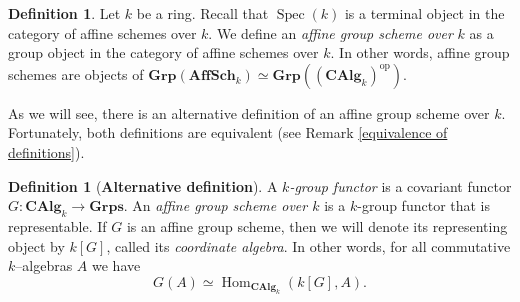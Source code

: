 \documentclass{article}
\theoremstyle{plain}
\theoremstyle{definition}
\newtheorem{Def}[Th]{Definition}
\DeclareMathOperator{\Hom}{Hom}
\DeclareMathOperator{\Spec}{Spec}
\begin{document}
\begin{Def}\label{def:gp scheme as a group object}
    Let $k$ be a ring. Recall that $\Spec(k)$ is a terminal object in the category of affine schemes over $k$. We define an \textit{affine group scheme over} $k$ as a group object in the category of affine schemes over $k$. In other words, affine group schemes are objects of $\textbf{Grp}(\textbf{AffSch}_k) \simeq \textbf{Grp}((\textbf{CAlg}_k)^{\text{op}})$.
\end{Def}

As we will see, there is an alternative definition of an affine group scheme over $k$. Fortunately, both definitions are equivalent (see Remark \ref{equivalence of definitions}).

\begin{Def}[\textbf{Alternative definition}]
A \textit{$k$-group functor} is a covariant  functor $G\colon \textbf{CAlg}_k \to \textbf{Grps}$. An \textit{affine group scheme over $k$} is a $k$-group functor that is representable. 
If $G$ is an affine group scheme, then we will denote its representing object by $k[G]$, called its \textit{coordinate algebra}. In other words, for all commutative $k$--algebras $A$ we have 
\[
G(A)\simeq \Hom_{\textbf{CAlg}_k}(k[G], A).
\]
\end{Def}
\end{document}
